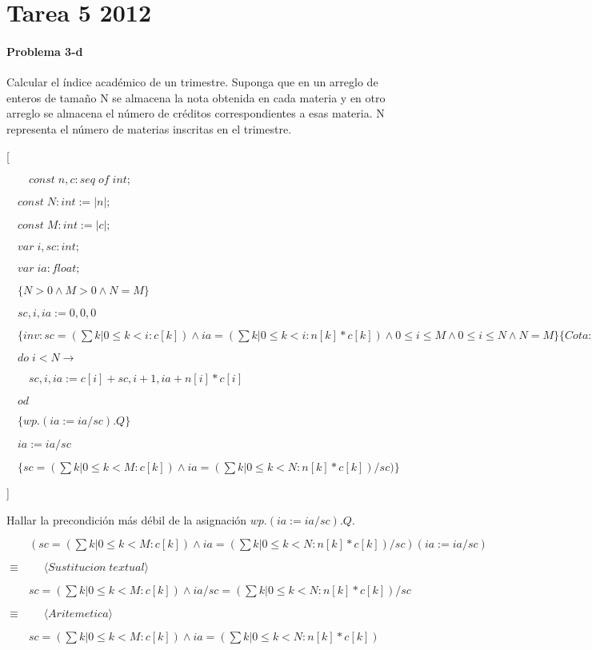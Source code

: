 \documentclass{article}
\begin{document}
\section*{Tarea 5 2012}

\paragraph{Problema 3-d} \par

Calcular el índice académico de un trimestre. Suponga que en un arreglo de enteros de tamaño N se almacena la nota obtenida en cada materia y en otro arreglo se almacena el número de créditos correspondientes a esas materia. N representa el número de materias inscritas en el trimestre.

[\par
$\quad\quad const\;n,c : seq\;of\;int;$\par
$\quad const\;N : int := |n|;$\par
$\quad const\;M : int := |c|;$\par
$\quad var\;i,sc : int;$\par
$\quad var\;ia : float;$\par
$\quad \{N>0 \land M>0 \land N=M \}$\par
$\quad sc, i, ia := 0,0,0$\par
$\quad \{inv: sc=(\sum k|0 \leq k < i: c[k]) \land ia=(\sum k|0 \leq k < i: n[k]*c[k]) \land 0 \leq i \leq M \land 0 \leq i \leq N \land N=M \}\{Cota: N-i\}$\par
$\quad do \; i < N \rightarrow $\par
$\quad\quad sc, i, ia := c[i]+sc, i + 1, ia+n[i]*c[i]$\par
$\quad od$\par
$\quad \{wp.(ia := ia/sc).Q\}$\par
$\quad ia := ia/sc$\par
$\quad \{sc=(\sum k|0 \leq k < M: c[k]) \land ia=(\sum k|0 \leq k < N: n[k]*c[k])/sc)\}$\par
]\par 

Hallar la precondición más débil de la asignación $wp.(ia := ia/sc).Q$.\par 

$\qquad (sc=(\sum k|0 \leq k < M: c[k]) \land ia=(\sum k|0 \leq k < N: n[k]*c[k])/sc)(ia := ia/sc)$\par 
$\equiv  \qquad \langle Sustitucion \; textual \rangle$\par
$\qquad sc=(\sum k|0 \leq k < M: c[k]) \land ia/sc=(\sum k|0 \leq k < N: n[k]*c[k])/sc$\par 
$\equiv  \qquad \langle Aritemetica \rangle$\par
$\qquad sc=(\sum k|0 \leq k < M: c[k]) \land ia=(\sum k|0 \leq k < N: n[k]*c[k])$\par 
\end{document}
